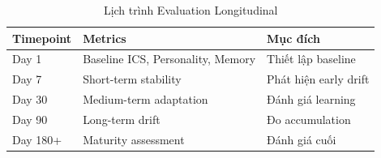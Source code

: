 \begin{table}[H]
\centering
\caption{Lịch trình Evaluation Longitudinal}
\label{tab:longitudinal-protocol}
\begin{tabular}{lll}
\toprule
\textbf{Timepoint} & \textbf{Metrics} & \textbf{Mục đích} \\
\midrule
Day 1 & Baseline ICS, Personality, Memory & Thiết lập baseline \\
Day 7 & Short-term stability & Phát hiện early drift \\
Day 30 & Medium-term adaptation & Đánh giá learning \\
Day 90 & Long-term drift & Đo accumulation \\
Day 180+ & Maturity assessment & Đánh giá cuối \\
\bottomrule
\end{tabular}
\end{table}

